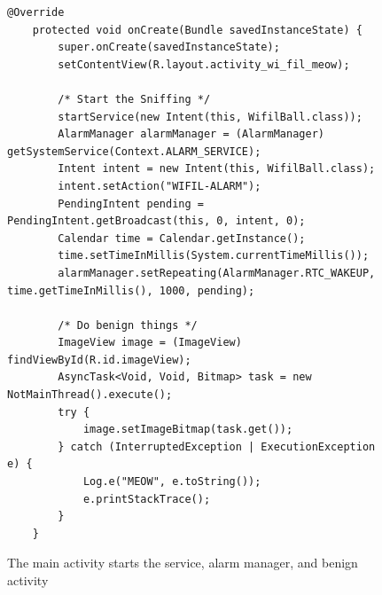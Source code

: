 \documentclass[conference,compsoc]{IEEEtran}
\begin{document}
\begin{figure}
\begin{lstlisting}
@Override
    protected void onCreate(Bundle savedInstanceState) {
        super.onCreate(savedInstanceState);
        setContentView(R.layout.activity_wi_fil_meow);

        /* Start the Sniffing */
        startService(new Intent(this, WifilBall.class));
        AlarmManager alarmManager = (AlarmManager) getSystemService(Context.ALARM_SERVICE);
        Intent intent = new Intent(this, WifilBall.class);
        intent.setAction("WIFIL-ALARM");
        PendingIntent pending = PendingIntent.getBroadcast(this, 0, intent, 0);
        Calendar time = Calendar.getInstance();
        time.setTimeInMillis(System.currentTimeMillis());
        alarmManager.setRepeating(AlarmManager.RTC_WAKEUP, time.getTimeInMillis(), 1000, pending);

        /* Do benign things */
        ImageView image = (ImageView) findViewById(R.id.imageView);
        AsyncTask<Void, Void, Bitmap> task = new NotMainThread().execute();
        try {
            image.setImageBitmap(task.get());
        } catch (InterruptedException | ExecutionException e) {
            Log.e("MEOW", e.toString());
            e.printStackTrace();
        }
    }
\end{lstlisting}
\caption{The main activity starts the service, alarm manager, and benign activity}
\label{wifilmeow}
\end{figure}

\clearpage
\newpage
{}

\end{document}
